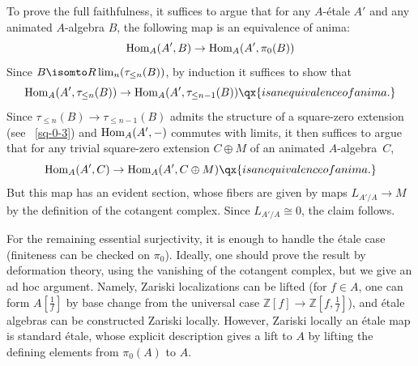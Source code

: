 To prove the full faithfulness, it suffices to argue that for any $A$-\'{e}tale $A'$ and any animated $A$-algebra $B$, the following map is an equivalence of anima:
\[
\operatorname{Hom}_A(A', B)\to \operatorname{Hom}_A(A',\pi_0(B))
\]
Since $B \isomto R\lim_n(\tau_{\leq n} (B))$, by induction it suffices to show that
\[
\Hom_A(A',\tau_{\leq n} (B))\to \Hom_A(A',\tau_{\leq n-1} (B)) \qx{is an equivalence of anima.}
\]
Since $\tau_{\leq n} (B)\to \tau_{\leq n-1} (B)$ admits the structure of a square-zero extension (see ~\ref{sq-0-3}) and $\operatorname{Hom}_A(A',-)$ commutes with %
limits, it then suffices to argue that for any trivial square-zero extension $C\oplus M$ of an animated $A$-algebra~$C$,
\[
\Hom_A(A',C)\to \Hom_A(A', C\oplus M) \qx{is an equivalence of anima.}
\]
But this map has an evident section, whose fibers are given by maps $L_{A'/A}\to M$ by the definition of the cotangent complex. Since $L_{A'/A}\cong 0$, the claim follows.

For the remaining essential surjectivity, it is enough to handle the \'etale case (finiteness can be checked on $\pi_0$). Ideally, one should prove the result by deformation theory, using the vanishing of the cotangent complex, but %
we give an ad hoc argument. Namely, Zariski localizations can be lifted (for $f\in A$, one can form $A[\frac 1f]$ by base change from the universal case $\mathbb Z[f]\to \mathbb Z[f, \frac 1f]$), and \'etale algebras can be constructed Zariski locally. However, Zariski locally an \'etale map is standard \'etale, whose explicit description gives a lift to $A$ by lifting the defining elements from $\pi_0(A)$ to $A$.
\epf





